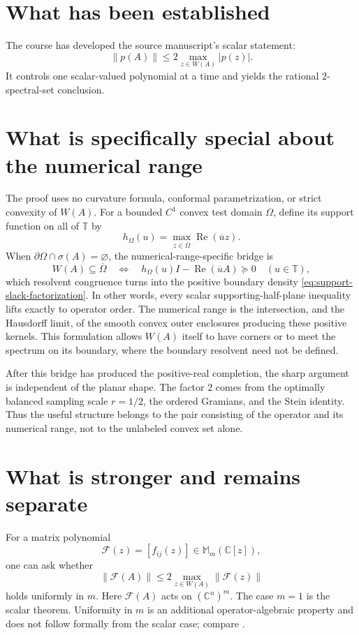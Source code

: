 \documentclass[11pt,oneside,openany]{book}
\theoremstyle{definition}
\theoremstyle{remark}
\newcommand{\C}{\mathbb C}
\newcommand{\Torus}{\mathbb T}
\newcommand{\RePart}{\operatorname{Re}}
\newcommand{\spec}{\sigma}
\newcommand{\norm}[1]{\left\lVert #1\right\rVert}
\begin{document}
\section{What has been established}

The course has developed the source manuscript's scalar statement:
\[
  \norm{p(A)}
  \leq2\max_{z\in W(A)}|p(z)|.
\]
It controls one scalar-valued polynomial at a time and yields the
rational \(2\)-spectral-set conclusion.

\section{What is specifically special about the numerical range}

The proof uses no curvature formula, conformal parametrization, or
strict convexity of \(W(A)\).  For a bounded \(C^1\) convex test
domain \(\Omega\), define its support function on all of \(\Torus\) by
\[
  h_\Omega(u)
  =
  \max_{z\in\overline\Omega}\RePart(\overline uz).
\]
When \(\partial\Omega\cap\spec(A)=\varnothing\), the
numerical-range-specific bridge is
\[
  W(A)\subseteq\overline\Omega
  \quad\Longleftrightarrow\quad
  h_\Omega(u)I-\RePart(\overline uA)\succeq0
  \quad(u\in\Torus),
\]
which resolvent congruence turns into the positive boundary density
\eqref{eq:support-slack-factorization}.  In other words, every scalar
supporting-half-plane inequality lifts exactly to operator order.
The numerical range is the intersection, and the Hausdorff limit, of
the smooth convex outer enclosures producing these positive kernels.
This formulation allows \(W(A)\) itself to have corners or to meet the
spectrum on its boundary, where the boundary resolvent need not be
defined.

After this bridge has produced the positive-real completion, the sharp
argument is independent of the planar shape.  The factor \(2\) comes
from the optimally balanced sampling scale \(r=1/2\), the ordered
Gramians, and the Stein identity.  Thus the useful structure belongs
to the pair consisting of the operator and its numerical range, not
to the unlabeled convex set alone.

\section{What is stronger and remains separate}

For a matrix polynomial
\[
  \mathcal F(z)=[f_{ij}(z)]\in\mathbb M_m(\C[z]),
\]
one can ask whether
\begin{equation}
  \norm{\mathcal F(A)}
  \leq2\max_{z\in W(A)}\norm{\mathcal F(z)}
  \label{eq:matrix-level-question}
\end{equation}
holds uniformly in \(m\).  Here \(\mathcal F(A)\) acts on
\((\C^n)^m\).  The case \(m=1\) is the scalar theorem.  Uniformity in
\(m\) is an additional operator-algebraic property and does not follow
formally from the scalar case; compare
\cite{DavidsonPaulsenWoerdeman2018}.
\end{document}
